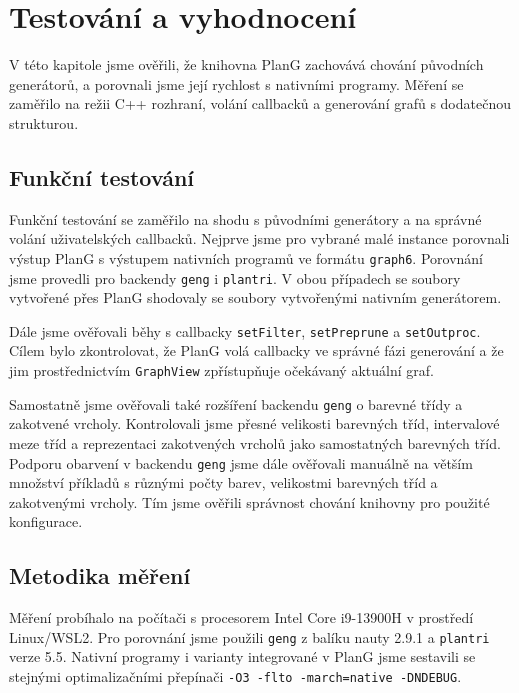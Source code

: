 \chapter{Testování a vyhodnocení}
\label{chap:evaluation}

V této kapitole jsme ověřili, že knihovna PlanG zachovává chování původních
generátorů, a porovnali jsme její rychlost s nativními programy. Měření se
zaměřilo na režii C++ rozhraní, volání callbacků a generování grafů s
dodatečnou strukturou.

\section{Funkční testování}
\label{sec:evaluation-functional}

Funkční testování se zaměřilo na shodu s původními generátory a na správné
volání uživatelských callbacků. Nejprve jsme pro vybrané malé instance
porovnali výstup PlanG s výstupem nativních programů ve formátu
\texttt{graph6}. Porovnání jsme provedli pro backendy \texttt{geng} i
\texttt{plantri}. V obou případech se soubory vytvořené přes PlanG shodovaly
se soubory vytvořenými nativním generátorem.

Dále jsme ověřovali běhy s callbacky \texttt{setFilter}, \texttt{setPreprune}
a \texttt{setOutproc}. Cílem bylo zkontrolovat, že PlanG volá callbacky ve
správné fázi generování a že jim prostřednictvím \texttt{GraphView}
zpřístupňuje očekávaný aktuální graf.

Samostatně jsme ověřovali také rozšíření backendu \texttt{geng} o barevné
třídy a zakotvené vrcholy. Kontrolovali jsme přesné velikosti barevných tříd,
intervalové meze tříd a reprezentaci zakotvených vrcholů jako samostatných
barevných tříd. Podporu obarvení v backendu \texttt{geng} jsme dále ověřovali
manuálně na větším množství příkladů s různými počty barev, velikostmi
barevných tříd a zakotvenými vrcholy. Tím jsme ověřili správnost chování knihovny pro použité konfigurace.

\section{Metodika měření}
\label{sec:evaluation-methodology}

Měření probíhalo na počítači s procesorem Intel Core i9-13900H v prostředí
Linux/WSL2. Pro porovnání jsme použili \texttt{geng} z balíku nauty 2.9.1 a
\texttt{plantri} verze 5.5. Nativní programy i varianty integrované v PlanG
jsme sestavili se stejnými optimalizačními přepínači
\texttt{-O3 -flto -march=native -DNDEBUG}.

